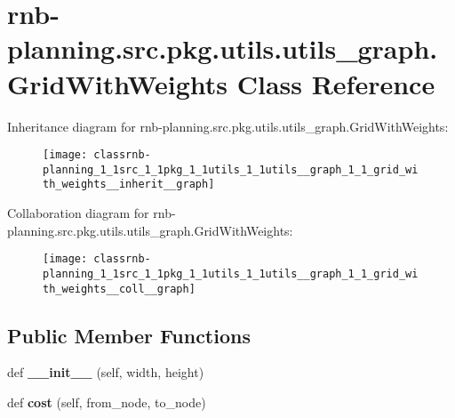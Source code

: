 \hypertarget{classrnb-planning_1_1src_1_1pkg_1_1utils_1_1utils__graph_1_1_grid_with_weights}{}\section{rnb-\/planning.src.\+pkg.\+utils.\+utils\+\_\+graph.\+Grid\+With\+Weights Class Reference}
\label{classrnb-planning_1_1src_1_1pkg_1_1utils_1_1utils__graph_1_1_grid_with_weights}


Inheritance diagram for rnb-\/planning.src.\+pkg.\+utils.\+utils\+\_\+graph.\+Grid\+With\+Weights\+:\nopagebreak
\begin{figure}[H]
\begin{center}
\leavevmode
\texttt{[image: classrnb-planning\_1\_1src\_1\_1pkg\_1\_1utils\_1\_1utils\_\_graph\_1\_1\_grid\_with\_weights\_\_inherit\_\_graph]}
\end{center}
\end{figure}


Collaboration diagram for rnb-\/planning.src.\+pkg.\+utils.\+utils\+\_\+graph.\+Grid\+With\+Weights\+:\nopagebreak
\begin{figure}[H]
\begin{center}
\leavevmode
\texttt{[image: classrnb-planning\_1\_1src\_1\_1pkg\_1\_1utils\_1\_1utils\_\_graph\_1\_1\_grid\_with\_weights\_\_coll\_\_graph]}
\end{center}
\end{figure}
\subsection*{Public Member Functions}
\begin{DoxyCompactItemize}
\item 
\mbox{\label{classrnb-planning_1_1src_1_1pkg_1_1utils_1_1utils__graph_1_1_grid_with_weights_aa4c2ec9dfefa07f36a3496ce63bda03f}} 
def {\bfseries \+\_\+\+\_\+init\+\_\+\+\_\+} (self, width, height)
\item 
\mbox{\label{classrnb-planning_1_1src_1_1pkg_1_1utils_1_1utils__graph_1_1_grid_with_weights_aa6e027c6cce7db8204158e489770b1e9}} 
def {\bfseries cost} (self, from\+\_\+node, to\+\_\+node)
\end{DoxyCompactItemize}
